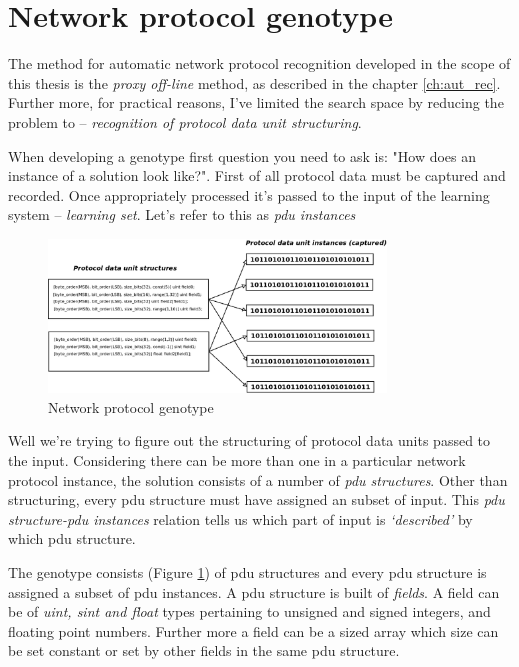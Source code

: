 \documentclass[times, utf8, diplomski]{fer}
\begin{document}
\section{Network protocol genotype}
The method for automatic network protocol recognition developed in the scope of
this thesis is the \emph{proxy off-line} method, as described in the chapter \ref{ch:aut_rec}.
Further more, for practical reasons, I've limited the search space by reducing the
problem to -- \emph{recognition of protocol data unit structuring}.

When developing a genotype first question you need to ask is: "How does an 
instance of a solution look like?". First of all protocol data must be captured
and recorded. Once appropriately processed it's passed to the input of the 
learning system -- \emph{learning set}. Let's refer to this as \emph{pdu instances}

\begin{figure}[htb]
\begin{center}
\leavevmode
\includegraphics[width=0.8\textwidth]{net_proto_gen}
\end{center}
\caption{Network protocol genotype}
\label{fig:net_proto_gen}
\end{figure}

Well we're trying to figure out the structuring of protocol data units passed to the input.
Considering there can be more than one in a particular network protocol instance, 
the solution consists of a number of \emph{pdu structures}. Other than structuring, 
every pdu structure must have assigned an subset of input. This \emph{pdu structure-pdu instances} 
relation tells us which part of input is \emph{`described'} by which pdu structure.

The genotype consists (Figure \ref{fig:net_proto_gen}) of pdu structures and every
pdu structure is assigned a subset of pdu instances. A pdu structure is built of
\emph{fields}. A field can be of \emph{uint, sint and float} types pertaining to
unsigned and signed integers, and floating point numbers. Further more a field can
be a sized array which size can be set constant or set by other fields in the same
pdu structure.
\end{document}
